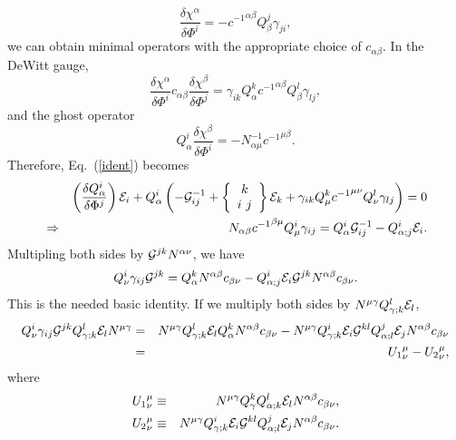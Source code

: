 \documentclass[a4paper,aps,preprint,groupedaddress,showpacs]{revtex4}
\begin{document}
\begin{equation}
\frac{\delta\chi^{\alpha}}{\delta\Phi^{i}}=
-{c^{-1}}^{\alpha\beta}Q^{j}_{\beta}\gamma_{ji},
\end{equation}
we can obtain minimal operators \cite{CK2}
with the appropriate choice
of $c_{\alpha\beta}$. In the DeWitt gauge,
\begin{equation}
\frac{\delta\chi^{\alpha}}{\delta\Phi^{i}}c_{\alpha\beta}
\frac{\delta\chi^{\beta}}{\delta\Phi^{j}}=
\gamma_{ik}Q^{k}_{\alpha}{c^{-1}}^{\alpha\beta}
Q^{l}_{\beta}\gamma_{lj},
\end{equation}
and the ghost operator
\begin{equation}
Q^{i}_{\alpha}\frac{\delta\chi^{\beta}}{\delta\Phi^{i}}=
-N^{-1}_{\alpha\mu}{c^{-1}}^{\mu\beta}.
\label{ghost}
\end{equation}
Therefore, Eq.~(\ref{ident}) becomes
\begin{eqnarray}
&&\left(\frac{\delta Q^{i}_{\alpha}}{\delta\Phi^{j}}\right)
{\cal E}_{i}+
Q^{i}_{\alpha}\left(-{\cal G}^{-1}_{ij}+
\left\{ \begin{array}{c} k \\ i\ j \end{array}\right\}
{\cal E}_{k}+\gamma_{ik}Q^{k}_{\mu}{c^{-1}}^{\mu\nu}
Q^{l}_{\nu}\gamma_{lj}\right)=0 \nonumber\\
&\Rightarrow&
N_{\alpha\beta}{c^{-1}}^{\beta\mu}Q^{i}_{\mu}\gamma_{ij}=
Q^{i}_{\alpha}{\cal G}^{-1}_{ij}-Q^{i}_{\alpha;j}{\cal E}_{i}.
\end{eqnarray}
Multipling both sides by ${\cal G}^{jk}N^{\alpha\nu}$, we have
\begin{equation}
Q^{i}_{\nu}\gamma_{ij}{\cal G}^{jk}=
Q^{k}_{\alpha}N^{\alpha\beta}c_{\beta\nu}-
Q^{i}_{\alpha;j}{\cal E}_{i}{\cal G}^{jk}N^{\alpha\beta}
c_{\beta\nu}.
\label{basic}
\end{equation}
This is the needed basic identity. If we multiply both sides by 
$N^{\mu\gamma}Q^{l}_{\gamma;k}{\cal E}_{l}$,
\begin{eqnarray}
Q^{i}_{\nu}\gamma_{ij}{\cal G}^{jk}Q^{l}_{\gamma;k}
{\cal E}_{l}N^{\mu\gamma}&=&
N^{\mu\gamma}Q^{l}_{\gamma;k}{\cal E}_{l}Q^{k}_{\alpha}
N^{\alpha\beta}c_{\beta\nu}-
N^{\mu\gamma}Q^{i}_{\gamma;k}{\cal E}_{i}{\cal G}^{kl}
Q^{j}_{\alpha;l}{\cal E}_{j}N^{\alpha\beta}c_{\beta\nu}
\nonumber\\
&=&{U_{1}}^{\mu}_{\nu}-{U_{2}}^{\mu}_{\nu},
\label{ident1}
\end{eqnarray}
where
\begin{eqnarray}
{U_{1}}^{\mu}_{\nu}&\equiv&N^{\mu\gamma}Q^{k}_{\gamma}
Q^{l}_{\alpha;k}{\cal E}_{l}N^{\alpha\beta}c_{\beta\nu},\\
{U_{2}}^{\mu}_{\nu}&\equiv&N^{\mu\gamma}Q^{i}_{\gamma;k}
{\cal E}_{i}{\cal G}^{kl}Q^{j}_{\alpha;l}{\cal E}_{j}
N^{\alpha\beta}c_{\beta\nu}.
\end{eqnarray}
\end{document}
